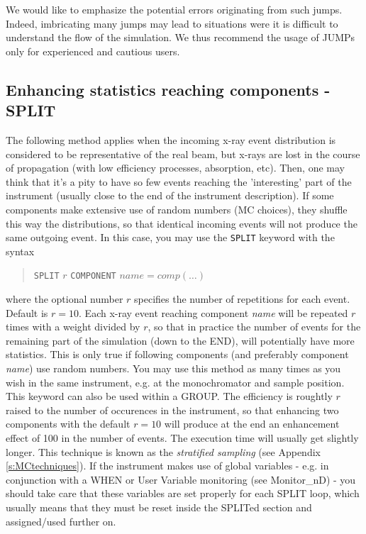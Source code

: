 We would like to emphasize the potential errors originating from such
jumps. Indeed, imbricating many jumps may lead to situations were it
is difficult to understand the flow of the simulation. We thus recommend the usage of JUMPs only for experienced and cautious users.

\subsection{Enhancing statistics reaching components - SPLIT}
\label{s:instrdefs-extend-enhance}

The following method applies when the incoming x-ray event distribution is considered to be representative of the real beam, but x-rays are lost in the course of propagation (with low efficiency processes, absorption, etc). Then, one may think that it's a pity to have so few events reaching the 'interesting' part of the instrument (usually close to the end of the instrument description).
If some components make extensive use of random numbers (MC choices), they shuffle this way the distributions, so that identical incoming events will not produce the same outgoing event. In this case, you may use the \verb+SPLIT+ keyword with the syntax

\begin{quote}
  \texttt{SPLIT} ${r}$ \texttt{COMPONENT} $\textit{name} = \textit{comp}(\ldots)$
\end{quote}

where the optional number $r$ specifies the number of repetitions for each event. Default is $r=10$.
Each x-ray event reaching component \textit{name} will be repeated $r$ times with a weight divided by $r$, so that in practice the number of events for the remaining part of the simulation (down to the END), will potentially have more statistics. This is only true if following components (and preferably component \textit{name}) use random numbers. You may use this method as many times as you wish in the same instrument, e.g. at the monochromator and sample position. This keyword can also be used within a GROUP. The efficiency is roughtly $r$ raised to the number of occurences in the instrument, so that enhancing two components with the default $r=10$ will produce at the end an enhancement effect of 100 in the number of events. The execution time will usually get slightly longer. This technique is known as the \emph{stratified sampling} (see Appendix \ref{s:MCtechniques}). If the instrument makes use of global variables - e.g. in conjunction with a WHEN or User Variable monitoring (see Monitor\_nD) - you should take care that these variables are set properly for each SPLIT loop, which usually means that they must be reset inside the SPLITed section and assigned/used further on. 

